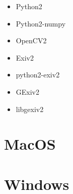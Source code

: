\documentclass[a4paper, 11pt]{article}
\begin{document}
\begin{itemize}

\item Python2
\item Python2-numpy
\item OpenCV2
\item Exiv2
\item python2-exiv2
\item GExiv2
\item libgexiv2

\end{itemize}

\section{MacOS}
\section{Windows}
\end{document}
